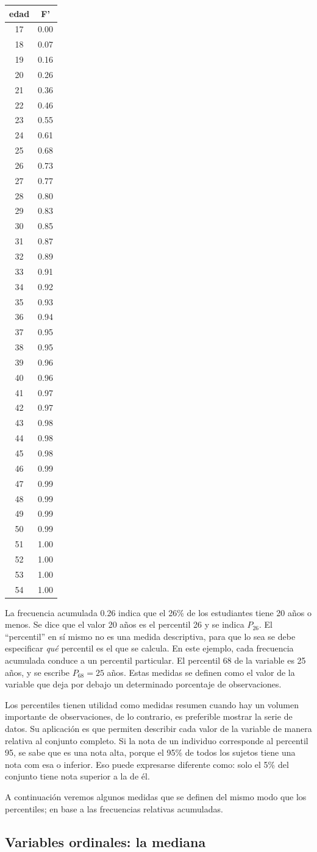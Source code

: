 \documentclass[]{book}
\begin{document}
\begin{longtable}[]{@{}cc@{}}
\toprule
edad & F'\tabularnewline
\midrule
\endhead
17 & 0.00\tabularnewline
18 & 0.07\tabularnewline
19 & 0.16\tabularnewline
20 & 0.26\tabularnewline
21 & 0.36\tabularnewline
22 & 0.46\tabularnewline
23 & 0.55\tabularnewline
24 & 0.61\tabularnewline
25 & 0.68\tabularnewline
26 & 0.73\tabularnewline
27 & 0.77\tabularnewline
28 & 0.80\tabularnewline
29 & 0.83\tabularnewline
30 & 0.85\tabularnewline
31 & 0.87\tabularnewline
32 & 0.89\tabularnewline
33 & 0.91\tabularnewline
34 & 0.92\tabularnewline
35 & 0.93\tabularnewline
36 & 0.94\tabularnewline
37 & 0.95\tabularnewline
38 & 0.95\tabularnewline
39 & 0.96\tabularnewline
40 & 0.96\tabularnewline
41 & 0.97\tabularnewline
42 & 0.97\tabularnewline
43 & 0.98\tabularnewline
44 & 0.98\tabularnewline
45 & 0.98\tabularnewline
46 & 0.99\tabularnewline
47 & 0.99\tabularnewline
48 & 0.99\tabularnewline
49 & 0.99\tabularnewline
50 & 0.99\tabularnewline
51 & 1.00\tabularnewline
52 & 1.00\tabularnewline
53 & 1.00\tabularnewline
54 & 1.00\tabularnewline
\bottomrule
\end{longtable}

La frecuencia acumulada 0.26 indica que el 26\% de los estudiantes tiene 20 años o menos. Se dice que el valor 20 años es el percentil 26 y se indica \(P_{26}\). El ``percentil'' en sí mismo no es una medida descriptiva, para que lo sea se debe especificar \emph{qué} percentil es el que se calcula. En este ejemplo, cada frecuencia acumulada conduce a un percentil particular. El percentil 68 de la variable es 25 años, y se escribe \(P_{68} = 25\) años. Estas medidas se definen como el valor de la variable que deja por debajo un determinado porcentaje de observaciones.

Los percentiles tienen utilidad como medidas resumen cuando hay un volumen importante de observaciones, de lo contrario, es preferible mostrar la serie de datos. Su aplicación es que permiten describir cada valor de la variable de manera relativa al conjunto completo. Si la nota de un individuo corresponde al percentil 95, se sabe que es una nota alta, porque el 95\% de todos los sujetos tiene una nota com esa o inferior. Eso puede expresarse diferente como: solo el 5\% del conjunto tiene nota superior a la de él.

A continuación veremos algunos medidas que se definen del mismo modo que los percentiles; en base a las frecuencias relativas acumuladas.

\hypertarget{variables-ordinales-la-mediana}{%
\subsection{Variables ordinales: la mediana}\label{variables-ordinales-la-mediana}}
\end{document}
